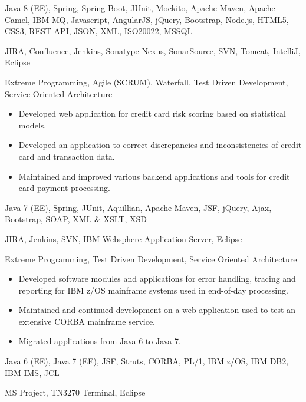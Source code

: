 \medskip
\begin{description}
	\ifincludestech
	\item [Technologies] Java 8 (EE), Spring, Spring Boot, JUnit, Mockito, Apache Maven, Apache Camel, IBM MQ, Javascript, AngularJS, jQuery, Bootstrap, Node.js, HTML5, CSS3, REST API, JSON, XML, ISO20022, MSSQL
	\fi
	\ifincludestools
	\item [Tools] JIRA, Confluence, Jenkins, Sonatype Nexus, SonarSource, SVN, Tomcat, IntelliJ, Eclipse
	\fi
	\ifincludesmethods
	\item [Methodologies] Extreme Programming, Agile (SCRUM), Waterfall, Test Driven Development, Service Oriented Architecture
	\fi
\end{description}

\divider


\medskip
\begin{itemize}
	\item Developed web application for credit card risk scoring based on statistical models.
	\item Developed an application to correct discrepancies and inconsistencies of credit card and transaction data.
	\item Maintained and improved various backend applications and tools for credit card payment processing.
\end{itemize}

\medskip
\begin{description}
	\ifincludestech
	\item [Technologies] Java 7 (EE), Spring, JUnit, Aquillian, Apache Maven, JSF, jQuery, Ajax, Bootstrap, SOAP, XML \& XSLT, XSD
	\fi
	\ifincludestools
	\item [Tools] JIRA, Jenkins, SVN, IBM Websphere Application Server, Eclipse
	\fi
	\ifincludesmethods
	\item [Methodologies] Extreme Programming, Test Driven Development, Service Oriented Architecture
	\fi
\end{description}

\divider


\medskip
\begin{itemize}
	\item Developed software modules and applications for error handling, tracing and reporting for IBM z/OS mainframe systems used in end-of-day processing.
	\item Maintained and continued development on a web application used to test an extensive CORBA mainframe service.
	\item Migrated applications from Java 6 to Java 7.
\end{itemize}

\medskip
\begin{description}
	\ifincludestech
	\item [Technologies] Java 6 (EE), Java 7 (EE), JSF, Struts, CORBA, PL/1, IBM z/OS, IBM DB2, IBM IMS, JCL
	\fi
	\ifincludestools
	\item [Tools] MS Project, TN3270 Terminal, Eclipse
	\fi
\end{description}
